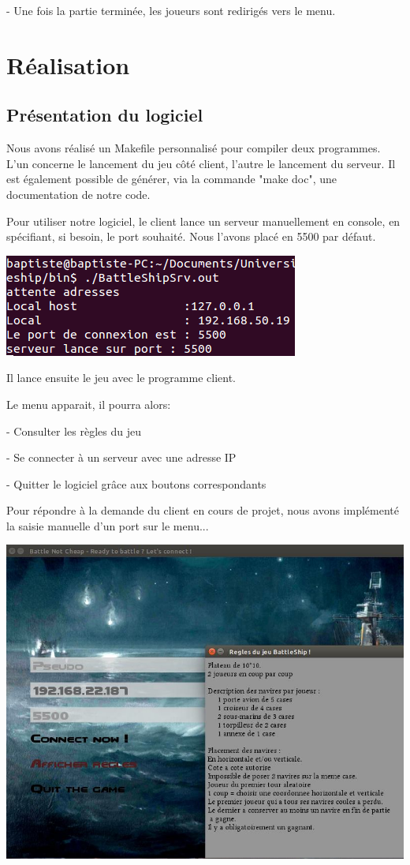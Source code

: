 \documentclass[a4paper,oneside]{article}
\begin{document}
	
	- Une fois la partie terminée, les joueurs sont redirigés vers le menu.

\clearpage


\section{Réalisation}
\subsection{Présentation du logiciel}

Nous avons réalisé un Makefile personnalisé pour compiler deux programmes. L'un concerne le lancement du jeu côté client, l'autre le lancement du serveur. 
Il est également possible de générer, via la commande "make doc", une documentation de notre code.

Pour utiliser notre logiciel, le client lance un serveur manuellement en console, en spécifiant, si besoin, le port souhaité. Nous l'avons placé en 5500 par défaut.
 \\
 \begin{center}
 	\includegraphics[width = 0.7\linewidth, height = 0.1\textheight ]{serveur.png}
 \end{center}
 
 
Il lance ensuite le jeu avec le programme client. 


Le menu apparait, il pourra alors: 


	- Consulter les règles du jeu


	- Se connecter à un serveur avec une adresse IP


	- Quitter le logiciel grâce aux boutons correspondants


Pour répondre à la demande du client en cours de projet, nous avons implémenté la saisie manuelle d'un port sur le menu...
\\
\begin{center}
	
	\includegraphics[width = 0.6\linewidth, height = 0.3\textheight ]{Ecran_de_connexion.jpg}
\end{center}
\end{document}
